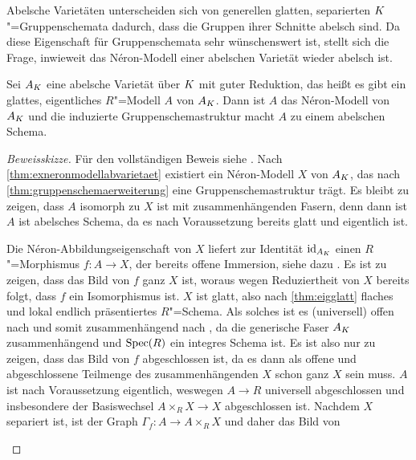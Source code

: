 Abelsche Varietäten unterscheiden sich von generellen glatten,
separierten $K$"=Gruppenschemata dadurch, dass die Gruppen ihrer
Schnitte abelsch sind. Da diese Eigenschaft für Gruppenschemata
sehr wünschenswert ist, stellt sich die Frage, inwieweit das
Néron-Modell einer abelschen Varietät wieder abelsch ist. 
\begin{Satz}\label{thm:abelscheneronmodelle}
  Sei $A_{K}$ eine abelsche Varietät über $K$ mit guter Reduktion,
  das heißt es gibt ein glattes, eigentliches $R$"=Modell $A$ von $A_{K}$.
  Dann ist $A$ das Néron-Modell von $A_{K}$ und die induzierte
  Gruppenschemastruktur macht $A$ zu einem abelschen Schema.
  \begin{proof}[Beweisskizze] Für den vollständigen Beweis siehe
    \cite[Proposition~1.4/2]{neron}.
    Nach \ref{thm:exneronmodellabvarietaet} existiert ein
    Néron-Modell $X$ von $A_{K}$, das nach
    \ref{thm:gruppenschemaerweiterung} eine Gruppenschemastruktur
    trägt.
    Es bleibt zu zeigen, dass $A$ isomorph zu $X$ ist
    mit zusammenhängenden Fasern, denn dann ist $A$ ist abelsches
    Schema, da es nach Voraussetzung bereits glatt und eigentlich ist.
    \begin{description}[font=\normalfont\itshape]
    \item[$A$ ist isomorph zu $X$:]
      Die Néron-Abbildungseigenschaft von $X$ liefert zur Identität
      $\mathrm{id}_{A_{K}}$ einen $R$"=Morphismus $f\colon A\to X$, der bereits
      offene Immersion, siehe dazu \cite[4.3/1~(ii) oder 4.4/1]{neron}.
      Es ist zu zeigen, dass das Bild von $f$ ganz $X$ ist, woraus
      wegen Reduziertheit von $X$ bereits folgt, dass $f$ ein
      Isomorphismus ist.
      $X$ ist glatt, also nach
      \ref{thm:eigglatt} flaches und lokal endlich präsentiertes
      $R$"=Schema.
      Als solches ist es (universell) offen nach
      \cite[Theorem~14.33]{wedhorn} und somit zusammenhängend nach
      \cite[Proposition~3.24]{wedhorn},
      da die generische Faser $A_{K}$ zusammenhängend und $\operatorname{Spec}(R)$
      ein integres Schema ist.
      Es ist also nur zu zeigen, dass das Bild von $f$ abgeschlossen
      ist, da es dann als offene und abgeschlossene Teilmenge des
      zusammenhängenden $X$ schon ganz $X$ sein muss.
      $A$ ist nach Voraussetzung eigentlich, weswegen ${A\to R}$
      universell abgeschlossen und insbesondere der Basiswechsel
      ${A\times_R X\to X}$ abgeschlossen ist.
      Nachdem $X$ separiert ist, ist der Graph
      ${\Gamma_f\colon A\to A\times_R X}$ und daher das Bild von

\end{description}
\end{proof}
\end{Satz}
